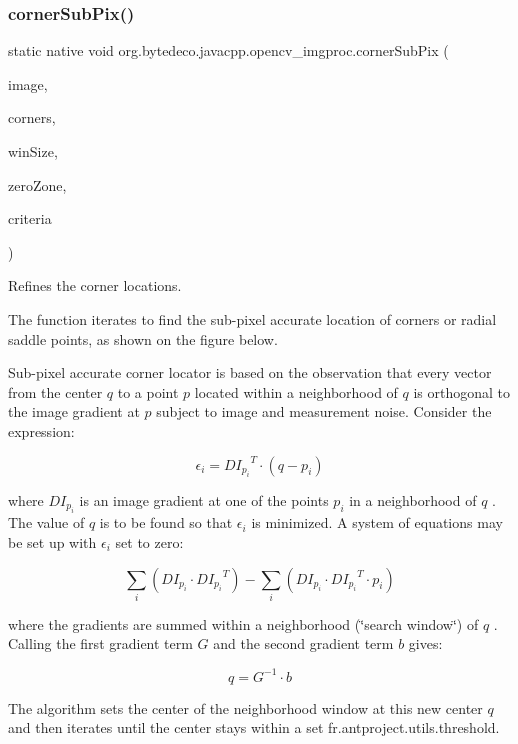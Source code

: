 \subsubsection{\texorpdfstring{corner\+Sub\+Pix()}{cornerSubPix()}}
{\footnotesize\ttfamily static native void org.\+bytedeco.\+javacpp.\+opencv\+\_\+imgproc.\+corner\+Sub\+Pix (\begin{DoxyParamCaption}\item[{@By\+Val Mat}]{image,  }\item[{@By\+Val Mat}]{corners,  }\item[{@By\+Val Size}]{win\+Size,  }\item[{@By\+Val Size}]{zero\+Zone,  }\item[{@By\+Val Term\+Criteria}]{criteria }\end{DoxyParamCaption})\hspace{0.3cm}{\ttfamily [static]}}



Refines the corner locations. 

The function iterates to find the sub-\/pixel accurate location of corners or radial saddle points, as shown on the figure below. 

 

Sub-\/pixel accurate corner locator is based on the observation that every vector from the center $q$ to a point $p$ located within a neighborhood of $q$ is orthogonal to the image gradient at $p$ subject to image and measurement noise. Consider the expression\+: 

\[\epsilon _i = {DI_{p_i}}^T \cdot (q - p_i)\] 

where ${DI_{p_i}}$ is an image gradient at one of the points $p_i$ in a neighborhood of $q$ . The value of $q$ is to be found so that $\epsilon_i$ is minimized. A system of equations may be set up with $\epsilon_i$ set to zero\+: 

\[\sum _i(DI_{p_i} \cdot {DI_{p_i}}^T) - \sum _i(DI_{p_i} \cdot {DI_{p_i}}^T \cdot p_i)\] 

where the gradients are summed within a neighborhood (\char`\"{}search window\char`\"{}) of $q$ . Calling the first gradient term $G$ and the second gradient term $b$ gives\+: 

\[q = G^{-1} \cdot b\] 

The algorithm sets the center of the neighborhood window at this new center $q$ and then iterates until the center stays within a set fr.antproject.utils.threshold.


